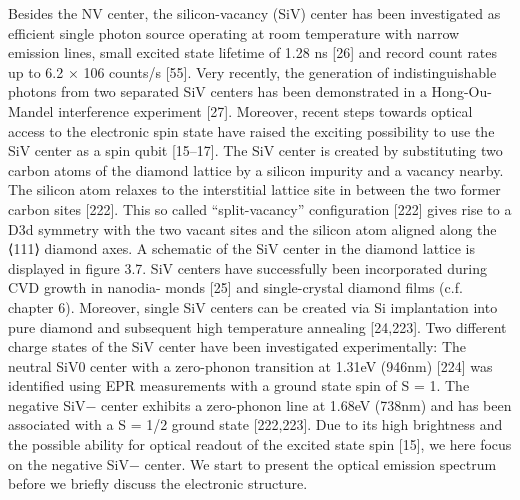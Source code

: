   Besides the NV center, the silicon-vacancy (SiV) center has been investigated as efficient single photon source operating at room temperature with narrow emission lines, small excited state lifetime of 1.28 ns [26] and record count rates up to 6.2 × 106 counts/s [55]. Very recently, the generation of indistinguishable photons from two separated SiV centers has been demonstrated in a Hong-Ou-Mandel interference experiment [27]. Moreover, recent steps towards optical access to the electronic spin state have raised the exciting possibility to use the SiV center as a spin qubit [15–17].
  The SiV center is created by substituting two carbon atoms of the diamond lattice by a silicon impurity and a vacancy nearby. The silicon atom relaxes to the interstitial lattice site in between the two former carbon sites [222]. This so called “split-vacancy” configuration [222] gives rise to a D3d symmetry with the two vacant sites and the silicon atom aligned along the ⟨111⟩ diamond axes. A schematic of the SiV center in the diamond lattice is displayed in figure 3.7.
  SiV centers have successfully been incorporated during CVD growth in nanodia- monds [25] and single-crystal diamond films (c.f. chapter 6). Moreover, single SiV centers can be created via Si implantation into pure diamond and subsequent high temperature annealing [24,223].
  Two different charge states of the SiV center have been investigated experimentally:
  The neutral SiV0 center with a zero-phonon transition at 1.31eV (946nm) [224] was identified using EPR measurements with a ground state spin of S = 1. The negative SiV− center exhibits a zero-phonon line at 1.68eV (738nm) and has been associated with a S = 1/2 ground state [222,223]. Due to its high brightness and the possible ability for optical readout of the excited state spin [15], we here focus on the negative SiV− center. We start to present the optical emission spectrum before we briefly discuss the electronic structure.

